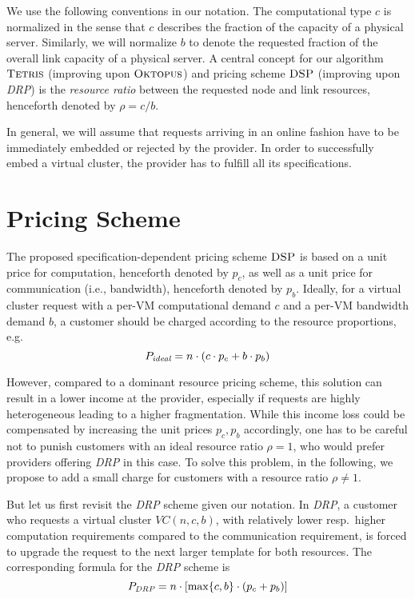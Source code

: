 \documentclass{sig-alternate-per}
\newcommand{\ALG}{\textsc{Tetris}}
\newcommand{\OKTO}{\textsc{Oktopus}}
\newcommand{\pricing}{\textsc{DSP}}
\begin{document}
We use the following conventions in our notation. The computational type $c$ is normalized in the sense that $c$
describes the fraction of the capacity of a physical server. Similarly, we will normalize
$b$ to denote the requested fraction of the overall link capacity of a physical server.
A central concept for our algorithm $\ALG$ (improving upon $\OKTO$) and pricing scheme $\pricing$ (improving upon \emph{DRP}) is the \emph{resource ratio} between
the requested node and link resources, henceforth denoted by $\rho = c/b$.

In general, we will assume that requests arriving in an online fashion have to be immediately embedded or rejected by the
provider. In order to successfully embed a virtual cluster, the provider has to fulfill all its specifications.

\section{Pricing Scheme}\label{sec:pricing}

The proposed specification-dependent pricing scheme $\pricing$ is based
on a unit price for computation, henceforth denoted by $p_c$, as well as a unit price
for communication (i.e., bandwidth), henceforth denoted by $p_b$.
Ideally, for a virtual cluster request with a per-VM computational demand $c$
and a per-VM bandwidth demand $b$, a customer should be charged according to the resource
proportions, e.g.
$$P_{\emph{ideal}}=n\cdot (c \cdot p_c + b \cdot p_b)$$

However, compared to a dominant resource pricing scheme,
this solution can result in a lower income at the provider,
especially if requests are highly heterogeneous leading to a higher fragmentation.
While this income loss could be compensated by increasing
the unit prices $p_c, p_b$
accordingly, one has to be careful not to punish customers with an ideal resource ratio $\rho=1$,
who would prefer providers offering \emph{DRP} in this case.
To solve this problem, in the following, we propose to add a small charge for customers with a resource ratio $\rho \neq 1$.

But let us first revisit the \emph{DRP} scheme given our notation.
In \emph{DRP}, a customer who requests a virtual cluster $VC(n,c,b)$, with relatively lower resp.~higher computation
requirements compared to the communication requirement, is forced to upgrade the request to the next larger
template for both resources.
The corresponding formula for the \emph{DRP} scheme is
$$P_{\emph{DRP}}=n\cdot \left[\max\{c, b\}\cdot (p_c + p_b)\right]$$
\end{document}
